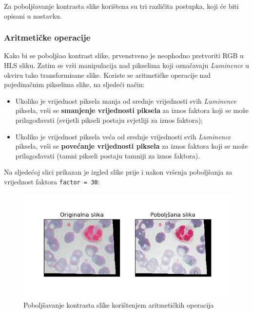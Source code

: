 \documentclass[12pt,a4paper]{article}
\begin{document}
Za poboljšavanje kontrasta slike korištena su tri različita postupka, koji će biti opisani u nastavku.

\subsubsection{Aritmetičke operacije}

Kako bi se poboljšao kontrast slike, prvenstveno je neophodno pretvoriti RGB u HLS sliku. Zatim se vrši manipulacija nad pikselima koji označavaju \textit{Luminence} u okviru tako transformisane slike. Koriste se aritmetičke operacije nad pojedinačnim pikselima slike, na sljedeći način:

\begin{itemize}

\item Ukoliko je vrijednost piksela manja od srednje vrijednosti svih \textit{Luminence} piksela, vrši se \textbf{smanjenje vrijednosti piksela} za iznos faktora koji se može prilagođavati (svijetli pikseli postaju svjetliji za iznos faktora);
\item Ukoliko je vrijednost piksela veća od srednje vrijednosti svih \textit{Luminence} piksela, vrši se \textbf{povećanje vrijednosti piksela} za iznos faktora koji se može prilagođavati (tamni pikseli postaju tamniji za iznos faktora).

\end{itemize}

Na sljedećoj slici prikazan je izgled slike prije i nakon vršenja poboljšanja za vrijednost faktora \texttt{factor = 30}:

\begin{figure}[H]

\center
\includegraphics[scale=0.9]{s3Kontrast1.png}
\caption{Poboljšavanje kontrasta slike korištenjem aritmetičkih operacija}

\end{figure}
\end{document}
